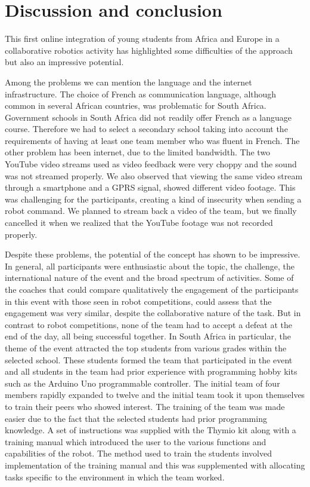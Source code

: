 \documentclass{intech-journal}
\begin{document}
\section{Discussion and conclusion}

This first online integration of young students from Africa and Europe in a collaborative robotics activity has highlighted some difficulties of the approach but also an impressive potential.

Among the problems we can mention the language and the internet infrastructure.
The choice of French as communication language, although common in several African countries, was problematic for South Africa.
Government schools in South Africa did not readily offer French as a language course.
Therefore we had to select a secondary school taking into account the requirements of having at least one team member who was fluent in French. 
The other problem has been internet, due to the limited bandwidth. 
The two YouTube video streams used as video feedback were very choppy and the sound was not streamed properly.
We also observed that viewing the same video stream through a smartphone and a GPRS signal, showed different video footage. 
This was challenging for the participants, creating a kind of insecurity when sending a robot command.
We planned to stream back a video of the team, but we finally cancelled it when we realized that the YouTube footage was not recorded properly.

Despite these problems, the potential of the concept has shown to be impressive.
In general, all participants were enthusiastic about the topic, the challenge, the international nature of the event and the broad spectrum of activities. 
Some of the coaches that could compare qualitatively the engagement of the participants in this event with those seen in robot competitions, could assess that the engagement was very similar, despite the collaborative nature of the task. 
But in contrast to robot competitions, none of the team had to accept a defeat at the end of the day, all being successful together. 
In South Africa in particular, the theme of the event attracted the top students from various grades within the selected school. 
These students formed the team that participated in the event and all students in the team had prior experience with programming hobby kits such as the Arduino Uno programmable controller. 
The initial team of four members rapidly expanded to twelve and the initial team took it upon themselves to train their peers who showed interest. 
The training of the team was made easier due to the fact that the selected students had prior programming knowledge. 
A set of instructions was supplied with the Thymio kit along with a training manual which introduced the user to the various functions and capabilities of the robot. 
The method used to train the students involved implementation of the training manual and this was supplemented with allocating tasks specific to the environment in which the team worked. 
\end{document}
